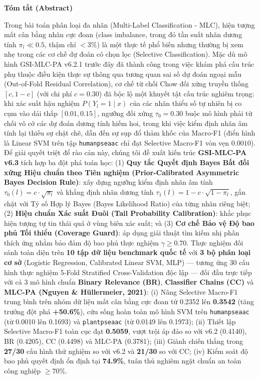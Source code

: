 \documentclass[10pt,a4paper,twoside]{article}
\begin{document}
\begin{center}\textbf{Tóm tắt (Abstract)}\end{center}
Trong bài toán phân loại đa nhãn (Multi-Label Classification - MLC), hiện tượng mất cân bằng nhãn cực đoan (class imbalance, trong đó tần suất nhãn dương tính $\pi_l \ll 0.5$, thậm chí $< 3\%$) là một thực tế phổ biến nhưng thường bị xem nhẹ trong các cơ chế dự đoán có chọn lọc (Selective Classification). Mặc dù mô hình GSI-MLC-PA v6.2.1 trước đây đã thành công trong việc khám phá cấu trúc phụ thuộc điều kiện thực sự thông qua tương quan sai số dự đoán ngoại mẫu (Out-of-Fold Residual Correlation), cơ chế từ chối Chow đối xứng truyền thống $[c, 1-c]$ (với chi phí $c = 0.30$) đã bộc lộ một khuyết tật cấu trúc nghiêm trọng: khi xác suất hậu nghiệm $P(Y_l = 1 \mid x)$ của các nhãn thiểu số tự nhiên bị co cụm vào dải thấp $[0.01, 0.15]$, ngưỡng đối xứng $\tau_0 = 0.30$ buộc mô hình phải từ chối vô cớ các dự đoán dương tính hiếm hoi, trong khi việc kiểm định nhãn âm tính lại thiếu sự chặt chẽ, dẫn đến sự sụp đổ thảm khốc của Macro-F1 (điển hình là Linear SVM trên tập \texttt{humanpseaac} chỉ đạt Selective Macro-F1 vỏn vẹn $0.0010$). Để giải quyết triệt để rào cản này, chúng tôi đề xuất kiến trúc \textbf{GSI-MLC-PA v6.3} tích hợp ba đột phá toán học: (1) \textbf{Quy tắc Quyết định Bayes Bất đối xứng Hiệu chuẩn theo Tiên nghiệm (Prior-Calibrated Asymmetric Bayes Decision Rule)}: xây dựng ngưỡng kiểm định nhãn âm tính $\tau_0(l) = c \cdot \sqrt{\pi_l}$ và khẳng định nhãn dương tính $\tau_1(l) = 1 - c \cdot \sqrt{1 - \pi_l}$, gắn chặt với Tỷ số Hợp lý Bayes (Bayes Likelihood Ratio) của từng nhãn riêng biệt; (2) \textbf{Hiệu chuẩn Xác suất Đuôi (Tail Probability Calibration)}: khắc phục hiện tượng tự tin thái quá ở vùng biên xác suất; và (3) \textbf{Cơ chế Bảo vệ Độ bao phủ Tối thiểu (Coverage Guard)}: áp dụng giải thuật tìm kiếm nhị phân thích ứng nhằm bảo đảm độ bao phủ thực nghiệm $\gamma \ge 0.70$. Thực nghiệm đối sánh toàn diện trên \textbf{10 tập dữ liệu benchmark quốc tế} với \textbf{3 bộ phân loại cơ sở} (Logistic Regression, Calibrated Linear SVM, MLP) --- tương ứng 30 cấu hình thực nghiệm 5-Fold Stratified Cross-Validation độc lập --- đối đầu trực tiếp với cả 3 mô hình chuẩn \textbf{Binary Relevance (BR)}, \textbf{Classifier Chains (CC)} và \textbf{MLC-PA (Nguyen \& Hüllermeier, 2021)}: (i) Nâng Selective Macro-F1 trung bình trên nhóm dữ liệu mất cân bằng cực đoan từ 0.2352 lên \textbf{0.3542} (tăng trưởng đột phá \textbf{+50.6\%}), cứu sống hoàn toàn mô hình SVM trên \texttt{humanpseaac} (từ 0.0010 lên 0.1693) và \texttt{plantpseaac} (từ 0.0149 lên 0.1973); (ii) Thiết lập Selective Macro-F1 toàn cục đạt \textbf{0.5059}, vượt trội áp đảo so với v6.2 (0.4140), BR (0.4205), CC (0.4498) và MLC-PA (0.3781); (iii) Giành chiến thắng trong \textbf{27/30} cấu hình thử nghiệm so với v6.2 và \textbf{21/30} so với CC; (iv) Kiểm soát độ bao phủ quyết định ổn định tại \textbf{74.9\%}, tuân thủ nghiêm ngặt chuẩn an toàn công nghiệp $\ge 70\%$.
\end{document}
